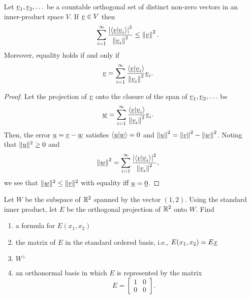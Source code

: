 \begin{corollary}
Let $\underline{v}_1, \underline{v}_2, \ldots$ be a countable orthogonal set of distinct non-zero vectors in an inner-product space $V$.
If $\underline{v} \in V$ then
\begin{equation*}
\sum_{i=1}^\infty \frac{ \left| \left\langle \underline{v} | \underline{v}_i \right\rangle \right|^2 }{ \left\| \underline{v}_i \right\|^2 }
\leq \left\| \underline{v} \right\|^2.
\end{equation*}
Moreover, equality holds if and only if
\begin{equation*}
\underline{v} = \sum_{i=1}^\infty \frac{ \left\langle \underline{v} | \underline{v}_i \right\rangle }{ \left\| \underline{v}_i \right\|^2 } \underline{v}_i.
\end{equation*}
\end{corollary}
\begin{proof}
Let the projection of $\underline{v}$ onto the closure of the span of $\underline{v}_1,\underline{v}_2,\ldots$ be
\begin{equation*}
\underline{w} = \sum_{i=1}^\infty \frac{ \left\langle \underline{v} | \underline{v}_i \right\rangle }{ \left\| \underline{v}_i \right\|^2 } \underline{v}_i.
\end{equation*}
Then, the error $\underline{u} = \underline{v} - \underline{w}$ satisfies  $\left\langle \underline{u} | \underline{w} \right\rangle = 0$ and $\left\| \underline{u} \right\|^2 = \left\| \underline{v} \right\|^2 - \left\| \underline{w} \right\|^2$.
Noting that $\| \underline{u} \|^2 \geq 0$ and 
\begin{equation*}
\left\| \underline{w} \right\|^2
= \sum_{i=1}^\infty \frac{ \left| \left\langle \underline{v} | \underline{v}_i \right\rangle \right|^2 }{ \left\| \underline{v}_i \right\|^2 },
\end{equation*}
we see that $\| \underline{w} \|^2 \leq \| \underline{v} \|^2$ with equality iff $\underline{u} = \underline{0}$.
\end{proof}


\begin{problem}
Let $W$ be the subspace of $\mathbb{R}^2$ spanned by the vector $(1,2)$.
Using the standard inner product, let $E$ be the orthogonal projection of $\mathbb{R}^2$ onto $W$.
Find
\begin{enumerate}
\item a formula for $E(x_1, x_2)$
\item the matrix of $E$ in the standard ordered basis, i.e., $E(x_1, x_2) = E \underline{x}$
\item $W^{\bot}$
\item an orthonormal basis in which $E$ is represented by the matrix
\begin{equation*}
E = \begin{bmatrix} 1 & 0 \\ 0 & 0 \end{bmatrix} .
\end{equation*}
\end{enumerate}
\end{problem}

